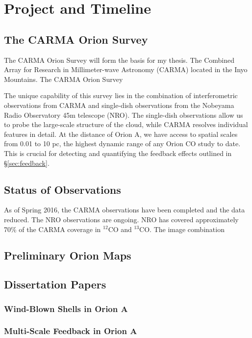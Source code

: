 \section{Project and Timeline}\label{sec:project}
    \subsection{The CARMA Orion Survey}\label{sec:carma}
    The CARMA Orion Survey will form the basis for my thesis. The Combined Array for Research in Millimeter-wave Astronomy (CARMA) located in the Inyo Mountains. The CARMA Orion Survey %
    
    The unique capability of this survey lies in the combination of interferometric observations from CARMA and single-dish observations from the Nobeyama Radio Observatory 45m telescope (NRO). The single-dish observations allow us to probe the large-scale structure of the cloud, while CARMA resolves individual features in detail. At the distance of Orion A, we have access to spatial scales from 0.01 to 10 pc, the highest dynamic range of any Orion CO study to date. This is crucial for detecting and quantifying the feedback effects outlined in \S\ref{sec:feedback}.
    \subsection{Status of Observations}\label{sec:status}
    As of Spring 2016, the CARMA observations have been completed and the data reduced. The NRO observations are ongoing. NRO has covered approximately 70\% of the CARMA coverage in $^{12}$CO and $^{13}$CO. The image combination 
    \subsection{Preliminary Orion Maps}\label{sec:maps}
    
    
    \subsection{Dissertation Papers}\label{sec:papers}
        \subsubsection{Wind-Blown Shells in Orion A}\label{sec:paper1}
        \subsubsection{Multi-Scale Feedback in Orion A}\label{sec:paper2}
